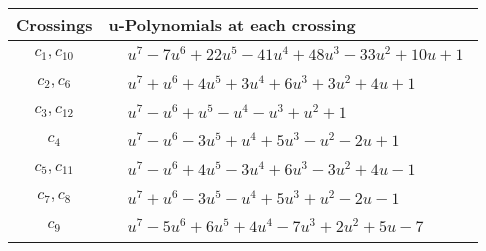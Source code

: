 \documentclass[1p]{elsarticle_modified}
\theoremstyle{definition}
\begin{document}
\begin{tabular}{m{50pt}|m{274pt}}
Crossings & \hspace{64pt}u-Polynomials at each crossing \\
\hline $$\begin{aligned}c_{1},c_{10}\end{aligned}$$&$\begin{aligned}
&u^7-7 u^6+22 u^5-41 u^4+48 u^3-33 u^2+10 u+1
\end{aligned}$\\
\hline $$\begin{aligned}c_{2},c_{6}\end{aligned}$$&$\begin{aligned}
&u^7+u^6+4 u^5+3 u^4+6 u^3+3 u^2+4 u+1
\end{aligned}$\\
\hline $$\begin{aligned}c_{3},c_{12}\end{aligned}$$&$\begin{aligned}
&u^7- u^6+u^5- u^4- u^3+u^2+1
\end{aligned}$\\
\hline $$\begin{aligned}c_{4}\end{aligned}$$&$\begin{aligned}
&u^7- u^6-3 u^5+u^4+5 u^3- u^2-2 u+1
\end{aligned}$\\
\hline $$\begin{aligned}c_{5},c_{11}\end{aligned}$$&$\begin{aligned}
&u^7- u^6+4 u^5-3 u^4+6 u^3-3 u^2+4 u-1
\end{aligned}$\\
\hline $$\begin{aligned}c_{7},c_{8}\end{aligned}$$&$\begin{aligned}
&u^7+u^6-3 u^5- u^4+5 u^3+u^2-2 u-1
\end{aligned}$\\
\hline $$\begin{aligned}c_{9}\end{aligned}$$&$\begin{aligned}
&u^7-5 u^6+6 u^5+4 u^4-7 u^3+2 u^2+5 u-7
\end{aligned}$\\
\hline
\end{tabular}\\~\\
\end{document}
